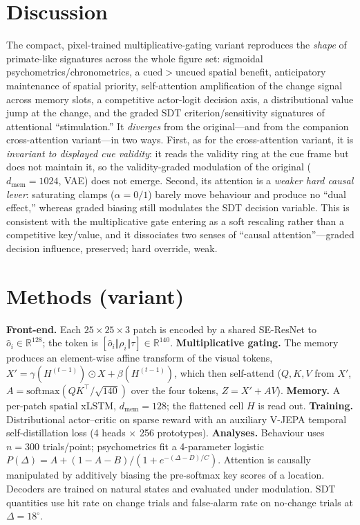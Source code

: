 \documentclass[11pt]{article}
\begin{document}
\section{Discussion}
The compact, pixel-trained multiplicative-gating variant reproduces the \emph{shape} of primate-like
signatures across the whole figure set: sigmoidal psychometrics/chronometrics, a cued$>$uncued spatial
benefit, anticipatory maintenance of spatial priority, self-attention amplification of the change signal
across memory slots, a competitive actor-logit decision axis, a distributional value jump at the change,
and the graded SDT criterion/sensitivity signatures of attentional ``stimulation.'' It \emph{diverges}
from the original---and from the companion cross-attention variant---in two ways. First, as for the
cross-attention variant, it is \emph{invariant to displayed cue validity}: it reads the validity ring at
the cue frame but does not maintain it, so the validity-graded modulation of the original
($d_{\mathrm{mem}}{=}1024$, VAE) does not emerge. Second, its attention is a \emph{weaker hard causal
lever}: saturating clamps ($\alpha{=}0/1$) barely move behaviour and produce no ``dual effect,'' whereas
graded biasing still modulates the SDT decision variable. This is consistent with the multiplicative
gate entering as a soft rescaling rather than a competitive key/value, and it dissociates two senses of
``causal attention''---graded decision influence, preserved; hard override, weak.

\section{Methods (variant)}
\textbf{Front-end.} Each $25\times25\times3$ patch is encoded by a shared SE-ResNet to
$\hat o_i\in\mathbb R^{128}$; the token is $[\hat o_i\Vert\rho_i\Vert\tau]\in\mathbb R^{140}$.
\textbf{Multiplicative gating.} The memory produces an element-wise affine transform of the visual
tokens, $X'{=}\gamma(H^{(t-1)})\odot X+\beta(H^{(t-1)})$, which then self-attend ($Q,K,V$ from $X'$,
$A=\mathrm{softmax}(QK^\top/\sqrt{140})$ over the four tokens, $Z=X'+AV$). \textbf{Memory.} A per-patch spatial
xLSTM, $d_{\mathrm{mem}}{=}128$; the flattened cell $H$ is read out. \textbf{Training.} Distributional
actor--critic on sparse reward with an auxiliary V-JEPA temporal self-distillation loss (4 heads
$\times$ 256 prototypes). \textbf{Analyses.} Behaviour uses $n{=}300$ trials/point; psychometrics fit a
4-parameter logistic $P(\Delta)=A+(1{-}A{-}B)/(1+e^{-(\Delta-D)/C})$. Attention is causally manipulated
by additively biasing the pre-softmax key scores of a location. Decoders are trained on natural states
and evaluated under modulation. SDT quantities use hit rate on change trials and false-alarm rate on
no-change trials at $\Delta{=}18^\circ$.
\end{document}
